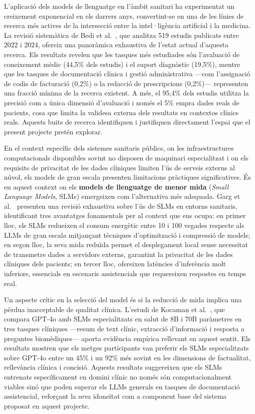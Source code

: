 \documentclass[11pt,a4paper]{article}
\begin{document}
L'aplicació dels models de llenguatge en l'àmbit sanitari ha experimentat un creixement exponencial en els darrers anys, convertint-se en una de les línies de recerca més actives de la intersecció entre la intel·ligència artificial i la medicina. La revisió sistemàtica de Bedi et al.~\cite{bedi2025llm}, que analitza 519 estudis publicats entre 2022 i 2024, ofereix una panoràmica exhaustiva de l'estat actual d'aquesta recerca. Els resultats revelen que les tasques més estudiades són l'avaluació de coneixement mèdic (44,5\% dels estudis) i el suport diagnòstic (19,5\%), mentre que les tasques de documentació clínica i gestió administrativa ---com l'assignació de codis de facturació (0,2\%) o la redacció de prescripcions (0,2\%)--- representen una fracció mínima de la recerca existent. A més, el 95,4\% dels estudis utilitza la precisió com a única dimensió d'avaluació i només el 5\% empra dades reals de pacients, cosa que limita la validesa externa dels resultats en contextos clínics reals. Aquests buits de recerca identifiquen i justifiquen directament l'espai que el present projecte pretén explorar.

En el context específic dels sistemes sanitaris públics, on les infraestructures computacionals disponibles sovint no disposen de maquinari especialitzat i on els requisits de privacitat de les dades clíniques limiten l'ús de serveis externs al núvol, els models de gran escala presenten limitacions pràctiques significatives. És en aquest context on els \textbf{models de llenguatge de menor mida} (\textit{Small Language Models}, SLMs) emergeixen com l'alternativa més adequada. Garg et al.~\cite{garg2025slm} presenten una revisió exhaustiva sobre l'ús de SLMs en entorns sanitaris, identificant tres avantatges fonamentals per al context que ens ocupa: en primer lloc, els SLMs redueixen el consum energètic entre 10 i 100 vegades respecte als LLMs de gran escala mitjançant tècniques d'optimització i compressió de models; en segon lloc, la seva mida reduïda permet el desplegament local sense necessitat de transmetre dades a servidors externs, garantint la privacitat de les dades clíniques dels pacients; en tercer lloc, ofereixen latències d'inferència molt inferiors, essencials en escenaris assistencials que requereixen respostes en temps real.

Un aspecte crític en la selecció del model és si la reducció de mida implica una pèrdua inacceptable de qualitat clínica. L'estudi de Kocaman et al.~\cite{kocaman2025clever}, que compara GPT-4o amb SLMs especialitzats en salut de 8B i 70B paràmetres en tres tasques clíniques ---resum de text clínic, extracció d'informació i resposta a preguntes biomèdiques--- aporta evidència empírica rellevant en aquest sentit. Els resultats mostren que els metges participants van preferir els SLMs especialitzats sobre GPT-4o entre un 45\% i un 92\% més sovint en les dimensions de factualitat, rellevància clínica i concisió. Aquests resultats suggereixen que els SLMs entrenats específicament en domini clínic no només són computacionalment viables sinó que poden superar els LLMs generals en tasques de documentació assistencial, reforçant la seva idoneïtat com a component base del sistema proposat en aquest projecte.
\end{document}
